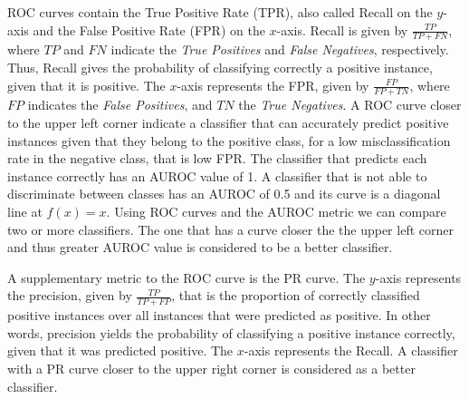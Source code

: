 \documentclass{acm_proc_article-sp}
\begin{document}
ROC curves contain the True Positive Rate (TPR), also called Recall on the $y$-axis and the False Positive Rate (FPR) on the $x$-axis. Recall is given by $\frac{TP}{TP + FN}$, where $TP$ and $FN$ indicate the \textit{True Positives} and \textit{False Negatives}, respectively. Thus, Recall gives the probability of classifying correctly a positive instance, given that it is positive. The $x$-axis represents the FPR, given by $\frac{FP}{FP + TN}$, where $FP$ indicates the \textit{False Positives}, and $TN$ the \textit{True Negatives}. A ROC curve closer to the upper left corner indicate a classifier that can accurately predict positive instances given that they belong to the positive class, for a low misclassification rate in the negative class, that is low FPR. The classifier that predicts each instance correctly has an AUROC value of 1. A classifier that is not able to discriminate between classes has an AUROC of 0.5 and its curve is a diagonal line at $f(x) = x$. Using ROC curves and the AUROC metric we can compare two or more classifiers. The one that has a curve closer the the upper left corner and thus greater AUROC value is considered to be a better classifier.

A supplementary metric to the ROC curve is the PR curve. The $y$-axis represents the precision, given by $\frac{TP}{TP + FP}$, that is the proportion of correctly classified positive instances over all instances that were predicted as positive. In other words, precision yields the probability of classifying a positive instance correctly, given that it was predicted positive. The $x$-axis represents the Recall. A classifier with a PR curve closer to the upper right corner is considered as a better classifier. 
\end{document}
